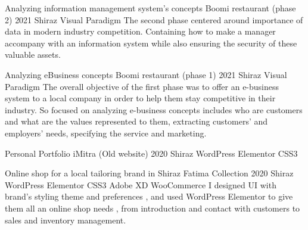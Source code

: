 \begin{cventries}
\cventry
{Analyzing information management system's concepts} %
{Boomi restaurant (phase 2)} %
{2021} %
{Shiraz} %
{
  Visual Paradigm
  \newline
  The second phase centered around importance of data in modern industry competition.
  Containing how to make a manager accompany with an information system while also ensuring
  the security of these valuable assets.
}

\cventry
{Analyzing eBusiness concepts} %
{Boomi restaurant (phase 1)} %
{2021} %
{Shiraz} %
{
  Visual Paradigm
  \newline
  The overall objective of the first phase was to offer an e-business system to a local company
  in order to help them stay competitive in their industry. So focused on analyzing e-business concepts
  includes who are customers and what are the values represented to them, extracting customers' and employers' needs,
  specifying the service and marketing.
}

\cventry
{Personal Portfolio} %
{iMitra (Old website)} %
{2020} %
{Shiraz} %
{
  WordPress \mitdiv Elementor \mitdiv CSS3
}

\cventry
{Online shop for a local tailoring brand in Shiraz} %
{Fatima Collection} %
{2020} %
{Shiraz} %
{
  WordPress \mitdiv Elementor \mitdiv CSS3 \mitdiv Adobe XD \mitdiv WooCommerce
  \newline
  I designed UI with brand's styling theme and preferences , and used WordPress Elementor to give them all an online shop needs , from introduction and contact with customers to sales and inventory management.
}


\end{cventries}
